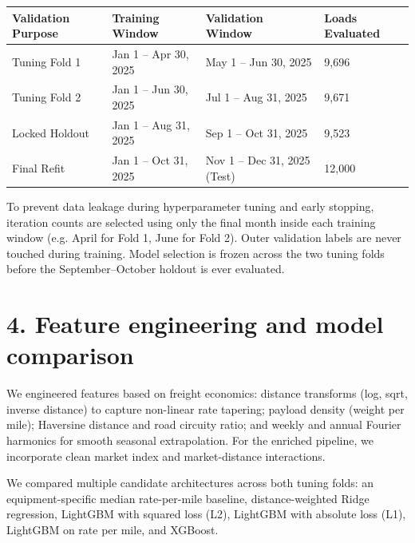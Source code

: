 \documentclass[10pt]{article}
\begin{document}
\begin{center}\small\begin{tabular}{llll}\toprule
Validation Purpose & Training Window & Validation Window & Loads Evaluated \\ \midrule
Tuning Fold 1 & Jan 1 -- Apr 30, 2025 & May 1 -- Jun 30, 2025 & 9,696 \\
Tuning Fold 2 & Jan 1 -- Jun 30, 2025 & Jul 1 -- Aug 31, 2025 & 9,671 \\
Locked Holdout & Jan 1 -- Aug 31, 2025 & Sep 1 -- Oct 31, 2025 & 9,523 \\
Final Refit & Jan 1 -- Oct 31, 2025 & Nov 1 -- Dec 31, 2025 (Test) & 12,000 \\
\bottomrule\end{tabular}\end{center}
To prevent data leakage during hyperparameter tuning and early stopping, iteration counts are selected using only the final month inside each training window (e.g. April for Fold 1, June for Fold 2). Outer validation labels are never touched during training. Model selection is frozen across the two tuning folds before the September--October holdout is ever evaluated.

\section*{4. Feature engineering and model comparison}
We engineered features based on freight economics: distance transforms (log, sqrt, inverse distance) to capture non-linear rate tapering; payload density (weight per mile); Haversine distance and road circuity ratio; and weekly and annual Fourier harmonics for smooth seasonal extrapolation. For the enriched pipeline, we incorporate clean market index and market-distance interactions.

We compared multiple candidate architectures across both tuning folds: an equipment-specific median rate-per-mile baseline, distance-weighted Ridge regression, LightGBM with squared loss (L2), LightGBM with absolute loss (L1), LightGBM on rate per mile, and XGBoost.
\end{document}
